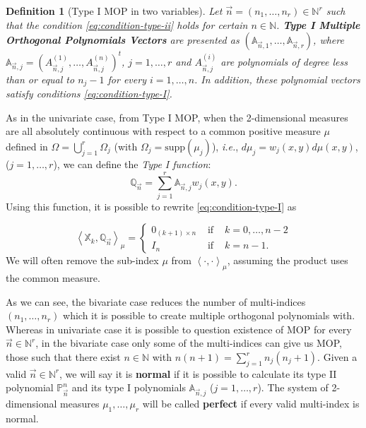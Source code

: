 \documentclass[12pt,a4]{article}
\theoremstyle{plain}
\newtheorem{definition}[theorem]{Definition}
\newcommand{\N}[0]{\mathbb{N}}
\newcommand{\supp}[0]{\mathrm{supp}}
\newcommand{\prodesc}[2]{\left\langle #1 , #2 \right\rangle}
\begin{document}
\begin{definition}[Type I MOP in two variables]
    Let $\vec n = (n_1, \dots, n_r)\in \N^r$ such that the condition \eqref{eq:condition-type-ii} holds for certain $n\in\N$. \textbf{Type I Multiple Orthogonal Polynomials Vectors} are presented as $(\mathbb A_{\vec n,1}, \dots, \mathbb A_{\vec n,r})$, where 
    $\mathbb A_{\vec n,j}=(A_{\vec n,j}^{(1)}, \dots, A_{\vec n,j}^{(n)})^t$, $j=1,\dots,r$ and $A_{\vec n,j}^{(i)}$ are polynomials of degree less than or equal to $n_j-1$ for every $i=1,\dots,n$. In addition, these polynomial vectors satisfy conditions \eqref{eq:condition-type-I}.     
\end{definition}

As in the univariate case, from Type I MOP, when the 2-dimensional measures are all absolutely continuous with respect to a common positive measure $\mu$ defined in $\Omega = \displaystyle\bigcup_{j=1}^r \Omega_j$ (with $\Omega_j=\supp(\mu_j)$), \textit{i.e.}, $d\mu_j = w_j(x,y)d\mu(x,y)$, ($j=1,\dots,r$), we can define the \textit{Type I function}:
\begin{equation}
    \label{eq:type-I-function-2-vars}
    \mathbb Q_{\vec n} = \sum_{j=1}^r \mathbb A_{\vec n,j}w_j(x,y).
\end{equation}
Using this function, it is possible to rewrite \eqref{eq:condition-type-I} as

\begin{equation}
    \prodesc{\mathbb X_k}{\mathbb Q_{\vec n}}_\mu = \left\{\begin{array}{ccl}
        0_{(k+1)\times n} &   \text{ if } & k=0,\dots,n-2 \\
        I_n & \text{ if } & k=n-1.
    \end{array}\right.     
\end{equation}
We will often remove the sub-index $\mu$ from $\prodesc{\cdot}{\cdot}_\mu$, assuming the product uses the common measure.

As we can see, the bivariate case reduces the number of multi-indices $(n_1,\dots,n_r)$ which it is possible to create multiple orthogonal polynomials with. Whereas in univariate case it is possible to question existence of MOP for every $\vec n\in \N^r$, in the bivariate case only some of the multi-indices can give us MOP, those such that there exist $n\in\N$ with $n(n+1)=\displaystyle\sum_{j=1}^r n_j (n_j+1)$. Given a valid $\vec n\in\N^r$, we will say it is \textbf{normal} if it is possible to calculate its type II polynomial $\mathbb P_{\vec n}^n$ and its type I polynomials $\mathbb A_{\vec n,j}$ ($j=1,\dots,r$). The system of 2-dimensional measures $\mu_1,\dots,\mu_r$ will be called \textbf{perfect} if every valid multi-index is normal.
\end{document}
